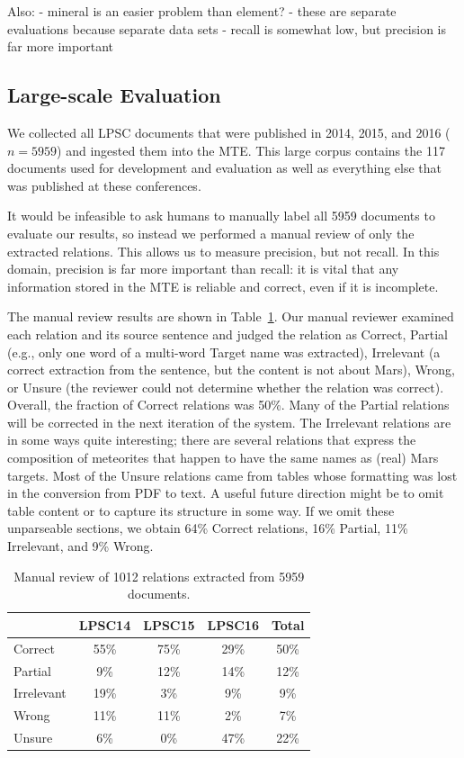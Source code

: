 \documentclass[letterpaper]{article} %
\begin{document}
Also:
- mineral is an easier problem than element?
- these are separate evaluations because separate data sets
- recall is somewhat low, but precision is far more important

\subsection{Large-scale Evaluation}

We collected all LPSC documents that were published in 2014, 2015, and
2016 ($n=5959$) and ingested them into the MTE.  This large corpus
contains the 117 documents used for development and evaluation as well
as everything else that was published at these conferences.


It would be infeasible to ask humans to manually label all 5959
documents to evaluate our results, so instead we performed a manual
review of only the extracted relations.  This allows us to measure
precision, but not recall.  In this domain, precision is far more
important than recall: it is vital that any information stored in the
MTE is reliable and correct, even if it is incomplete.

The manual review results are shown in Table~\ref{tab:large}.  Our
manual reviewer examined each relation and its source sentence and
judged the relation as Correct, Partial (e.g., only one word of a
multi-word Target name was extracted), Irrelevant (a correct
extraction from the sentence, but the content is not about Mars),
Wrong, or Unsure (the reviewer could not determine whether the
relation was correct). 
%
Overall, the fraction of Correct relations was 50\%.  Many of the
Partial relations will be corrected in the next iteration of the
system.  The Irrelevant relations are in some ways quite interesting;
there are several relations that express the composition of meteorites
that happen to have the same names as (real) Mars targets.
%
Most of the Unsure relations came from tables whose formatting was
lost in the conversion from PDF to text.  A useful future direction
might be to omit table content or to capture its structure in some
way.  If we omit these unparseable sections, we obtain 64\% Correct
relations, 16\% Partial, 11\% Irrelevant, and 9\% Wrong.

\begin{table}
\caption{Manual review of 1012 relations extracted from 5959 documents.} 
\label{tab:large}
\begin{center}
\begin{tabular}{l|ccc|c}
        & LPSC14 & LPSC15 & LPSC16 & Total \\ \hline
Correct    & 55\% & 75\% & 29\% & 50\% \\ \hline
Partial    &  9\% & 12\% & 14\% & 12\% \\
Irrelevant & 19\% &  3\% &  9\% &  9\% \\
Wrong      & 11\% & 11\% &  2\% &  7\% \\
Unsure     &  6\% &  0\% & 47\% & 22\% \\
\hline
\end{tabular}
\end{center}
\end{table}
\end{document}
